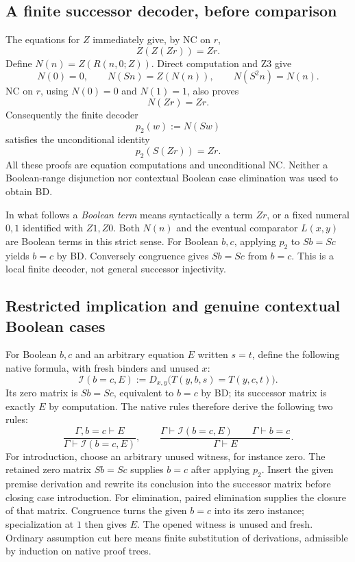 \subsection{A finite successor decoder, before comparison}

The equations for $Z$ immediately give, by NC on $r$,
\[
                         Z(Z(Zr))=Zr.
 \tag{Z3}\label{eq:native-sr-Z3}
\]
Define $N(n)=Z(R(n,0;Z))$.  Direct computation and Z3 give
\[
             N(0)=0,\qquad N(Sn)=Z(N(n)),\qquad N(S^2n)=N(n).
\]
NC on $r$, using $N(0)=0$ and $N(1)=1$, also proves
\[
                              N(Zr)=Zr.
\]
Consequently the finite decoder
\[
                              p_2(w):=N(Sw)
\]
satisfies the unconditional identity
\[
                       p_2(S(Zr))=Zr.
 \tag{BD}\label{eq:native-sr-boolean-decoder}
\]
All these proofs are equation computations and unconditional NC.
Neither a Boolean-range disjunction nor contextual Boolean case
elimination was used to obtain BD.

In what follows a \emph{Boolean term} means syntactically a term $Zr$,
or a fixed numeral $0,1$ identified with $Z1,Z0$.  Both $N(n)$ and the
eventual comparator $L(x,y)$ are Boolean terms in this strict sense.
For Boolean $b,c$, applying $p_2$ to $Sb=Sc$ yields $b=c$ by BD.
Conversely congruence gives $Sb=Sc$ from $b=c$.
This is a local finite decoder, not general successor injectivity.

\subsection{Restricted implication and genuine contextual Boolean cases}

For Boolean $b,c$ and an arbitrary equation $E$ written $s=t$, define
the following native formula, with fresh binders and unused $x$:
\[
 \mathcal I(b=c,E)
 :=D_{x,y}\bigl(T(y,b,s)=T(y,c,t)\bigr).
 \tag{BI}\label{eq:native-sr-boolean-implication}
\]
Its zero matrix is $Sb=Sc$, equivalent to $b=c$ by BD; its successor
matrix is exactly $E$ by computation.  The native rules therefore derive
the following two rules:
\[
 \frac{\Gamma,b=c\vdash E}{\Gamma\vdash\mathcal I(b=c,E)},
 \qquad
 \frac{\Gamma\vdash\mathcal I(b=c,E)\qquad\Gamma\vdash b=c}
      {\Gamma\vdash E}.
 \tag{BII,BIE}\label{eq:native-sr-boolean-implication-rules}
\]
For introduction, choose an arbitrary unused witness, for instance zero.
The retained zero matrix $Sb=Sc$ supplies $b=c$ after applying $p_2$.
Insert the given premise derivation and rewrite its conclusion into the
successor matrix before closing case introduction.  For elimination,
paired elimination supplies the closure of that matrix.  Congruence
turns the given $b=c$ into its zero instance; specialization at $1$
then gives $E$.  The opened witness is unused and fresh.  Ordinary
assumption cut here means finite substitution of derivations, admissible
by induction on native proof trees.


